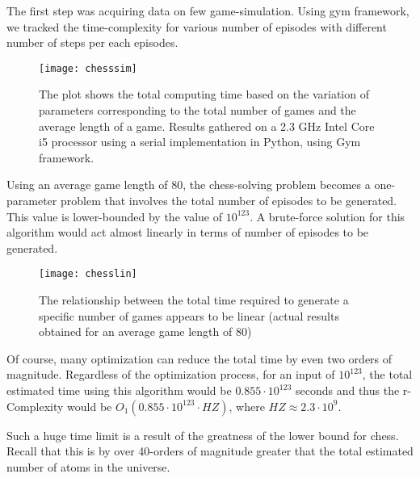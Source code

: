 The first step was acquiring data on few game-simulation. Using gym framework, we tracked the time-complexity for various number of episodes with different number of steps per each episodes.

    \begin{figure}[H]
        \centering
        \texttt{[image: chesssim]}
        \caption{The plot shows the total computing time based on the variation of parameters corresponding to the total number of games and the average length of a game. Results gathered on a 2.3 GHz Intel Core i5 processor using a serial implementation in Python, using Gym framework. }
    \end{figure}

Using an average game length of 80, the chess-solving problem becomes a one-parameter problem that involves the total number of episodes to be generated. This value is lower-bounded by the value of $10^{123}$. A brute-force solution for this algorithm would act almost linearly in terms of number of episodes to be generated.

    \begin{figure}[H]
        \centering
        \texttt{[image: chesslin]}
        \caption{The relationship between the total time required to generate a specific number of games appears to be linear (actual results obtained for an average game length of 80)}
    \end{figure}
 
Of course, many optimization can reduce the total time by even two orders of magnitude. Regardless of the optimization process, for an input of $10^{123}$, the total estimated time using this algorithm would be $0.855 \cdot 10^{123}$ seconds and thus the r-Complexity would be $O_{1}(0.855 \cdot 10^{123} \cdot HZ)$, where $HZ \approx 2.3 \cdot 10^9$.

Such a huge time limit is a result of the greatness of the lower bound for chess. Recall that this is by over 40-orders of magnitude greater that the total estimated number of atoms in the universe.
